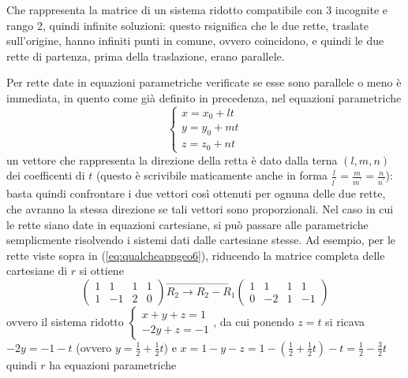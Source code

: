 Che rappresenta la matrice di un sistema ridotto compatibile con 3 incognite e rango 2, quindi infinite
soluzioni: questo rsignifica che le due rette, traslate sull'origine, hanno infiniti punti in comune,
ovvero coincidono, e quindi le due rette di partenza, prima della traslazione, erano parallele.
\begin{oss}
  \label{oss:qualcheappgeo3}
Per rette date in equazioni parametriche verificate se esse sono parallele o meno è immediata, in quento
come già definito in precedenza, nel equazioni parametriche
\begin{equation*}
  \begin{cases}
    x=x_0+lt\\
    y=y_0+mt\\
    z=z_0+nt
  \end{cases}
\end{equation*}
un vettore che rappresenta la direzione della retta è dato dalla terna $(l,m,n)$ dei coefficenti di
$t$ (questo è scrivibile maticamente anche in forma $\frac{l}{l^\prime}=\frac{m}{m^\prime}=
\frac{n}{n^\prime}$): basta quindi confrontare i due vettori così ottenuti per ognuna delle due rette,
che avranno la stessa direzione se tali vettori sono proporzionali. Nel caso in cui le rette siano date
in equazioni cartesiane, si può passare alle parametriche semplicmente risolvendo i sistemi dati dalle
cartesiane stesse. Ad esempio, per le rette viste sopra in (\ref{eq:qualcheappgeo6}), riducendo la
matrice completa delle cartesiane di $r$ si ottiene
\begin{equation*}
  \left(
    \begin{array}{ccc|c}
      1 & 1 & 1 & 1 \\
      1 & -1 & 2 & 0
    \end{array}
  \right)\overrightarrow{R_2\to R_2-R_1}
\left(
  \begin{array}{ccc|c}
    1 & 1 & 1 & 1 \\
      0 & -2 & 1 & -1
  \end{array}
\right)
\end{equation*}
ovvero il sistema ridotto $
\begin{cases}
  x+y+z=1\\
  -2y+z=-1
\end{cases}
$, da cui ponendo $z=t$ si ricava $-2y=-1-t$ (ovvero $y=\frac{1}{2}+\frac{1}{2}t$) e $x=1-y-z=
1-\left(\frac{1}{2}+\frac{1}{2}t\right)-t=\frac{1}{2}-\frac{3}{2}t$ quindi $r$ ha equazioni parametriche
  \begin{equation}
    \label{eq:qualcheappgeo8}

\end{equation}
\end{oss}
